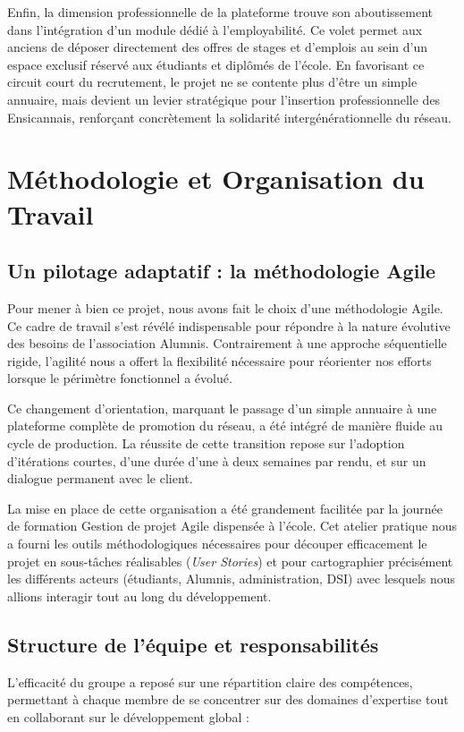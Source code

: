 \documentclass[a4paper,12pt]{article}
\begin{document}
Enfin, la dimension professionnelle de la plateforme trouve son aboutissement dans l'intégration d'un module dédié à l'employabilité. Ce volet permet aux anciens de déposer directement des offres de stages et d'emplois au sein d'un espace exclusif réservé aux étudiants et diplômés de l'école. En favorisant ce circuit court du recrutement, le projet ne se contente plus d'être un simple annuaire, mais devient un levier stratégique pour l'insertion professionnelle des Ensicannais, renforçant concrètement la solidarité intergénérationnelle du réseau.

\newpage

\section{Méthodologie et Organisation du Travail}

\subsection{Un pilotage adaptatif : la méthodologie Agile}
Pour mener à bien ce projet, nous avons fait le choix d'une méthodologie Agile. Ce cadre de travail s'est révélé indispensable pour répondre à la nature évolutive des besoins de l'association Alumnis. Contrairement à une approche séquentielle rigide, l'agilité nous a offert la flexibilité nécessaire pour réorienter nos efforts lorsque le périmètre fonctionnel a évolué.

Ce changement d'orientation, marquant le passage d'un simple annuaire à une plateforme complète de promotion du réseau, a été intégré de manière fluide au cycle de production. La réussite de cette transition repose sur l'adoption d'itérations courtes, d'une durée d'une à deux semaines par rendu, et sur un dialogue permanent avec le client.

La mise en place de cette organisation a été grandement facilitée par la journée de formation \og Gestion de projet Agile \fg{} dispensée à l'école. Cet atelier pratique nous a fourni les outils méthodologiques nécessaires pour découper efficacement le projet en sous-tâches réalisables (\textit{User Stories}) et pour cartographier précisément les différents acteurs (étudiants, Alumnis, administration, DSI) avec lesquels nous allions interagir tout au long du développement.

\subsection{Structure de l'équipe et responsabilités}
L'efficacité du groupe a reposé sur une répartition claire des compétences, permettant à chaque membre de se concentrer sur des domaines d'expertise tout en collaborant sur le développement global :
\end{document}
